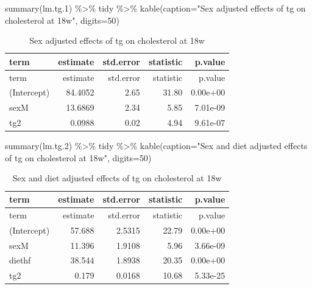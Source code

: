 \documentclass[
]{article}
\newenvironment{Shaded}{\begin{snugshade}}{\end{snugshade}}
\newcommand{\AttributeTok}[1]{\textcolor[rgb]{0.77,0.63,0.00}{#1}}
\newcommand{\DecValTok}[1]{\textcolor[rgb]{0.00,0.00,0.81}{#1}}
\newcommand{\FloatTok}[1]{\textcolor[rgb]{0.00,0.00,0.81}{#1}}
\newcommand{\FunctionTok}[1]{\textcolor[rgb]{0.00,0.00,0.00}{#1}}
\newcommand{\NormalTok}[1]{#1}
\newcommand{\SpecialCharTok}[1]{\textcolor[rgb]{0.00,0.00,0.00}{#1}}
\newcommand{\StringTok}[1]{\textcolor[rgb]{0.31,0.60,0.02}{#1}}
\begin{document}
\begin{Shaded}
\begin{Highlighting}[]
\FunctionTok{summary}\NormalTok{(lm.tg}\FloatTok{.1}\NormalTok{) }\SpecialCharTok{\%\textgreater{}\%}\NormalTok{ tidy }\SpecialCharTok{\%\textgreater{}\%} \FunctionTok{kable}\NormalTok{(}\AttributeTok{caption=}\StringTok{"Sex adjusted effects of tg on cholesterol at 18w"}\NormalTok{, }\AttributeTok{digits=}\DecValTok{50}\NormalTok{)}
\end{Highlighting}
\end{Shaded}

\begin{longtable}[]{@{}lrrrr@{}}
\caption{Sex adjusted effects of tg on cholesterol at
18w}\tabularnewline
\toprule()
term & estimate & std.error & statistic & p.value \\
\midrule()
\endfirsthead
\toprule()
term & estimate & std.error & statistic & p.value \\
\midrule()
\endhead
(Intercept) & 84.4052 & 2.65 & 31.80 & 0.00e+00 \\
sexM & 13.6869 & 2.34 & 5.85 & 7.01e-09 \\
tg2 & 0.0988 & 0.02 & 4.94 & 9.61e-07 \\
\bottomrule()
\end{longtable}

\begin{Shaded}
\begin{Highlighting}[]
\FunctionTok{summary}\NormalTok{(lm.tg}\FloatTok{.2}\NormalTok{) }\SpecialCharTok{\%\textgreater{}\%}\NormalTok{ tidy }\SpecialCharTok{\%\textgreater{}\%} \FunctionTok{kable}\NormalTok{(}\AttributeTok{caption=}\StringTok{"Sex and diet adjusted effects of tg on cholesterol at 18w"}\NormalTok{, }\AttributeTok{digits=}\DecValTok{50}\NormalTok{)}
\end{Highlighting}
\end{Shaded}

\begin{longtable}[]{@{}lrrrr@{}}
\caption{Sex and diet adjusted effects of tg on cholesterol at
18w}\tabularnewline
\toprule()
term & estimate & std.error & statistic & p.value \\
\midrule()
\endfirsthead
\toprule()
term & estimate & std.error & statistic & p.value \\
\midrule()
\endhead
(Intercept) & 57.688 & 2.5315 & 22.79 & 0.00e+00 \\
sexM & 11.396 & 1.9108 & 5.96 & 3.66e-09 \\
diethf & 38.544 & 1.8938 & 20.35 & 0.00e+00 \\
tg2 & 0.179 & 0.0168 & 10.68 & 5.33e-25 \\
\bottomrule()
\end{longtable}
\end{document}
